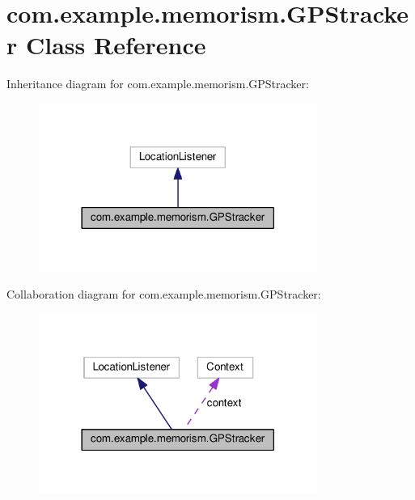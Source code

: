\hypertarget{classcom_1_1example_1_1memorism_1_1_g_p_stracker}{}\section{com.\+example.\+memorism.\+G\+P\+Stracker Class Reference}
\label{classcom_1_1example_1_1memorism_1_1_g_p_stracker}


Inheritance diagram for com.\+example.\+memorism.\+G\+P\+Stracker\+:\nopagebreak
\begin{figure}[H]
\begin{center}
\leavevmode
\includegraphics[width=258pt]{dc/d42/classcom_1_1example_1_1memorism_1_1_g_p_stracker__inherit__graph}
\end{center}
\end{figure}


Collaboration diagram for com.\+example.\+memorism.\+G\+P\+Stracker\+:\nopagebreak
\begin{figure}[H]
\begin{center}
\leavevmode
\includegraphics[width=258pt]{de/df9/classcom_1_1example_1_1memorism_1_1_g_p_stracker__coll__graph}
\end{center}
\end{figure}
